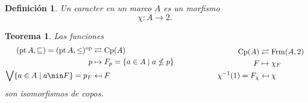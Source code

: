 \documentclass[12pt,letterpaper,titlepage]{article}
\newtheorem*{defn}{Definición}
\newtheorem{thm}{Teorema}
\theoremstyle{definition}
\newcommand\Sup{\bigvee}
\newcommand\<{\langle}
\renewcommand\>{\rangle}
\newcommand{\Frm}{\mathrm{Frm}}
\newcommand{\Cp}{\mathrm{Cp}}
\newcommand{\op}{\mathrm{op}}
\DeclareMathOperator{\pt}{pt}
\begin{document}

\begin{defn}
    Un caracter en un marco $A$ es un morfismo
    \[
        \chi:A\to 2
    .\]
\end{defn}

\begin{thm}
    Las funciones
    \[
        \begin{aligned}
            (\pt A,\sqsubseteq)
            =(\pt A,\leq)^\op &\rightleftarrows \Cp(A) \\
            p &\mapsto F_p=\{a\in A\mid a\nleq p\} \\
            \Sup\{a\in A\mid a\nin F\} = p_F &\mapsfrom F
        \end{aligned}
        \hspace{20mm}
        \begin{aligned}
            \Cp(A) &\rightleftarrows \Frm(A,2) \\
            F &\mapsto \chi_F \\
            \chi^{-1}(1) = F_\chi &\mapsfrom \chi
        \end{aligned}
    \]
    son isomorfismos de copos.
\end{thm}
\end{document}
